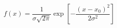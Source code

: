 \documentclass[../main.tex]{subfiles}%
\begin{document}
%
    \Xequation%
    \begin{equation}%
        f(x) =%
        \dfrac{1}{\sigma\sqrt{2\pi}}%
        \exp\left[-\dfrac{(x-x_{0})^{2}}{2\sigma^{2}}\right]%
        \label{eq:normal-distribution}%
    \end{equation}%
\end{document}
